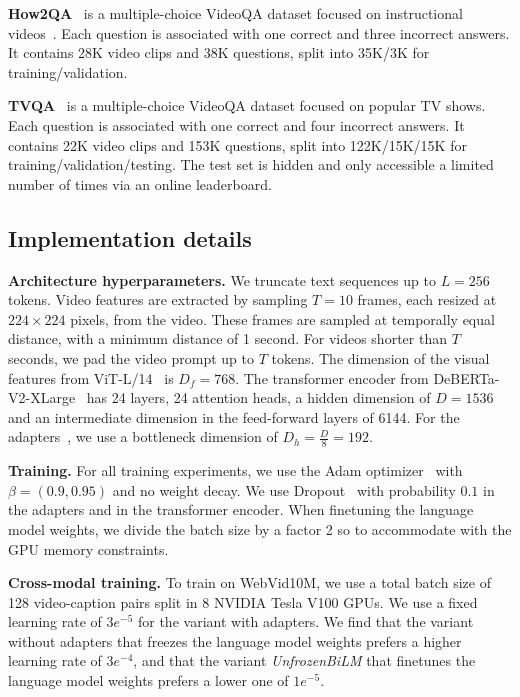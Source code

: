 \noindent \textbf{How2QA}~\cite{li2020hero} is a multiple-choice VideoQA dataset focused on instructional videos~\cite{miech19howto100m}.
Each question is associated with one correct and three incorrect answers. 
It contains 28K video clips and 38K questions, split into 35K/3K for training/validation.

\noindent \textbf{TVQA}~\cite{lei2018tvqa} is a multiple-choice VideoQA dataset focused on popular TV shows.
Each question is associated with one correct and four incorrect answers. 
It contains 22K video clips and 153K questions, split into 122K/15K/15K for training/validation/testing.
The test set is hidden and only accessible a limited number of times via an online leaderboard.

\subsection{Implementation details}\label{sec:addimplem}

\noindent \textbf{Architecture hyperparameters.} 
We truncate text sequences up to $L=256$ tokens.
Video features are extracted by sampling $T=10$ frames, each resized at $224 \times 224$ pixels, from the video.
These frames are sampled at temporally equal distance, with a minimum distance of 1 second.
For videos shorter than $T$ seconds, we pad the video prompt up to $T$ tokens.
The dimension of the visual features from ViT-L/14~\cite{dosovitskiy2021an} is $D_f=768$.
The transformer encoder from DeBERTa-V2-XLarge~\cite{he2021deberta} has 24 layers, 24 attention heads, a hidden dimension of $D=1536$ and an intermediate dimension in the feed-forward layers of 6144.
For the adapters~\cite{houlsby2019parameter}, we use a bottleneck dimension of $D_h=\frac{D}{8}=192$.

\noindent \textbf{Training.} 
For all training experiments, we use the Adam optimizer~\cite{kingma15adam} with $\beta=(0.9, 0.95)$ and no weight decay.
We use Dropout~\cite{srivastava2014dropout} with probability $0.1$ in the adapters and in the transformer encoder.
When finetuning the language model weights, we divide the batch size by a factor 2 so to accommodate with the GPU memory constraints.

\noindent \textbf{Cross-modal training.}
To train on WebVid10M, we use a total batch size of 128 video-caption pairs split in 8 NVIDIA Tesla V100 GPUs.
We use a fixed learning rate of $3e^{-5}$ for the variant with adapters.
We find that the variant without adapters that freezes the language model weights prefers a higher learning rate of $3e^{-4}$, and that the variant \textit{UnfrozenBiLM} that finetunes the language model weights prefers a lower one of $1e^{-5}$.

